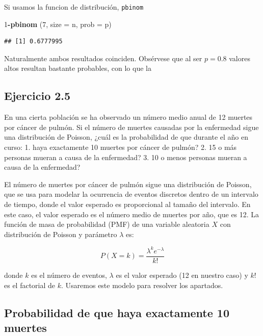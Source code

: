 \documentclass[
]{article}
\newenvironment{Shaded}{\begin{snugshade}}{\end{snugshade}}
\newcommand{\AttributeTok}[1]{\textcolor[rgb]{0.13,0.29,0.53}{#1}}
\newcommand{\DecValTok}[1]{\textcolor[rgb]{0.00,0.00,0.81}{#1}}
\newcommand{\FunctionTok}[1]{\textcolor[rgb]{0.13,0.29,0.53}{\textbf{#1}}}
\newcommand{\NormalTok}[1]{#1}
\newcommand{\SpecialCharTok}[1]{\textcolor[rgb]{0.81,0.36,0.00}{\textbf{#1}}}
\begin{document}
Si usamos la funcion de distribución, \texttt{pbinom}

\begin{Shaded}
\begin{Highlighting}[]
\DecValTok{1}\SpecialCharTok{{-}}\FunctionTok{pbinom}\NormalTok{ (}\DecValTok{7}\NormalTok{, }\AttributeTok{size =}\NormalTok{ n, }\AttributeTok{prob =}\NormalTok{ p)}
\end{Highlighting}
\end{Shaded}

\begin{verbatim}
## [1] 0.6777995
\end{verbatim}

Naturalmente ambos resultados coinciden. Obsérvese que al ser \(p=0.8\) valores altos resultan bastante probables, con lo que la

\subsection{Ejercicio 2.5}\label{ejercicio-2.5}

En una cierta población se ha observado un número medio anual de 12 muertes por cáncer de pulmón. Si el número de muertes causadas por la enfermedad sigue una distribución de Poisson, ¿cuál es la probabilidad de que durante el año en curso:
1. haya exactamente 10 muertes por cáncer de pulmón?
2. 15 o más personas mueran a causa de la enfermedad?
3. 10 o menos personas mueran a causa de la enfermedad?

El número de muertes por cáncer de pulmón sigue una distribución de Poisson, que se usa para modelar la ocurrencia de eventos discretos dentro de un intervalo de tiempo, donde el valor esperado es proporcional al tamaño del intervalo. En este caso, el valor esperado es el número medio de muertes por año, que es 12. La función de masa de probabilidad (PMF) de una variable aleatoria \(X\) con distribución de Poisson y parámetro \(\lambda\) es:

\[ P(X = k) = \frac{\lambda^k e^{-\lambda}}{k!} \]

donde \(k\) es el número de eventos, \(\lambda\) es el valor esperado (12 en nuestro caso) y \(k!\) es el factorial de \(k\). Usaremos este modelo para resolver los apartados.

\subsection{Probabilidad de que haya exactamente 10 muertes}\label{probabilidad-de-que-haya-exactamente-10-muertes}
\end{document}
